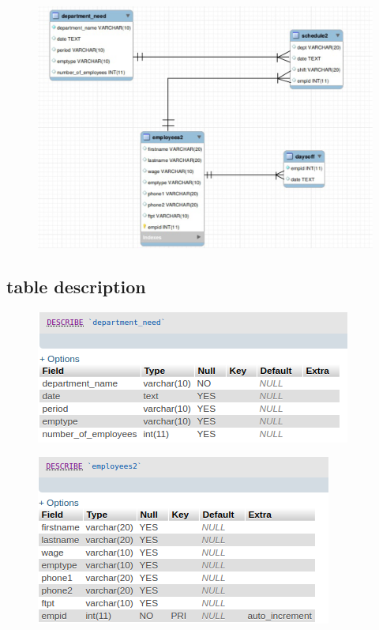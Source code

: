 \documentclass[11pt]{article}
\makeatletter
\def\maxwidth{\ifdim\Gin@nat@width>\linewidth\linewidth
    \else\Gin@nat@width\fi}
\let\Oldincludegraphics\includegraphics
\renewcommand{\includegraphics}[1]{\Oldincludegraphics[width=.8\maxwidth]{#1}}
\makeatother
\begin{document}
    \begin{figure}[H]
\centering
\includegraphics{er.png}
\caption{}
\end{figure}

    \subsection*{table description}\label{table-description}

    \begin{figure}[H]
\centering
\includegraphics{1.png}
\caption{}
\end{figure}

\begin{figure}[H]
\centering
\includegraphics{2.png}
\caption{}
\end{figure}
\end{document}

